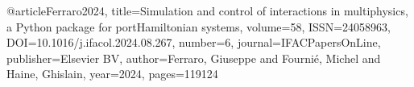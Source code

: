 \documentclass[letterpaper,10pt,english]{sphinxmanual}
\begin{document}
\begin{sphinxVerbatim}[commandchars=\\\{\}]
@articleFerraro2024,
  title=Simulation and control of interactions in multi\PYGZhy{}physics, a Python package for port\PYGZhy{}Hamiltonian systems,
  volume=58,
  ISSN=2405\PYGZhy{}8963,
  DOI=10.1016/j.ifacol.2024.08.267,
  number=6,
  journal=IFAC\PYGZhy{}PapersOnLine,
  publisher=Elsevier BV,
  author=Ferraro, Giuseppe and Fournié, Michel and Haine, Ghislain,
  year=2024,
  pages=119\PYGZhy{}\PYGZhy{}124
\end{sphinxVerbatim}


\renewcommand{\indexname}{Python Module Index}
\begin{sphinxtheindex}
\let\bigletter\sphinxstyleindexlettergroup
\bigletter{s}
\item\relax{}
\end{sphinxtheindex}

\renewcommand{\indexname}{Index}
\printindex
\end{document}
